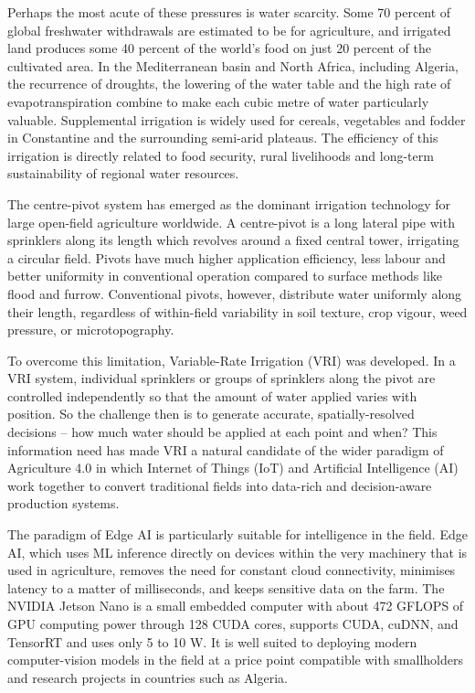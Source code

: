 \documentclass[12pt,a4paper]{report}
\begin{document}
Perhaps the most acute of these pressures is water scarcity. Some 70 percent of global freshwater withdrawals are estimated to be for agriculture, and irrigated land produces some 40 percent of the world's food on just 20 percent of the cultivated area. In the Mediterranean basin and North Africa, including Algeria, the recurrence of droughts, the lowering of the water table and the high rate of evapotranspiration combine to make each cubic metre of water particularly valuable. Supplemental irrigation is widely used for cereals, vegetables and fodder in Constantine and the surrounding semi-arid plateaus. The efficiency of this irrigation is directly related to food security, rural livelihoods and long-term sustainability of regional water resources.

The centre-pivot system has emerged as the dominant irrigation technology for large open-field agriculture worldwide. A centre-pivot is a long lateral pipe with sprinklers along its length which revolves around a fixed central tower, irrigating a circular field. Pivots have much higher application efficiency, less labour and better uniformity in conventional operation compared to surface methods like flood and furrow. Conventional pivots, however, distribute water uniformly along their length, regardless of within-field variability in soil texture, crop vigour, weed pressure, or microtopography.

To overcome this limitation, Variable-Rate Irrigation (VRI) was developed. In a VRI system, individual sprinklers or groups of sprinklers along the pivot are controlled independently so that the amount of water applied varies with position. So the challenge then is to generate accurate, spatially-resolved decisions -- how much water should be applied at each point and when? This information need has made VRI a natural candidate of the wider paradigm of Agriculture 4.0 in which Internet of Things (IoT) and Artificial Intelligence (AI) work together to convert traditional fields into data-rich and decision-aware production systems.

The paradigm of Edge AI is particularly suitable for intelligence in the field. Edge AI, which uses ML inference directly on devices within the very machinery that is used in agriculture, removes the need for constant cloud connectivity, minimises latency to a matter of milliseconds, and keeps sensitive data on the farm. The NVIDIA Jetson Nano is a small embedded computer with about 472 GFLOPS of GPU computing power through 128 CUDA cores, supports CUDA, cuDNN, and TensorRT and uses only 5 to 10 W. It is well suited to deploying modern computer-vision models in the field at a price point compatible with smallholders and research projects in countries such as Algeria.
\end{document}

